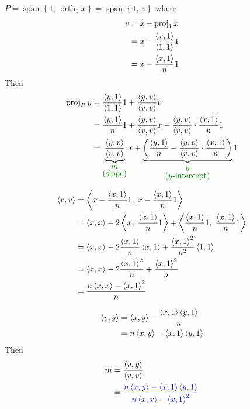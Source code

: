 \nl $P = \operatorname{span}\left\{1, \, \operatorname{orth}_{1}x \right\} = \operatorname{span}\left\{1,\, v\right\}$ where
\begin{align*}
    v &= x - \proj{1}{x}\\
    &= x - \frac{\inner{x,1}}{\inner{1,1}}{1}\\
    &= x - \frac{\inner{x,1}}{n}{1}
\end{align*}
Then 
\begin{align*}
    \proj{P}{y} &= \frac{\inner{y,1}}{\inner{1,1}}1 + \frac{\inner{y,v}}{\inner{v,v}} v\\
    &= \frac{\inner{y,1}}{n}{1} + \frac{\inner{y,v}}{\inner{v,v}}x -\frac{\inner{y,v}}{\inner{v,v}} \cdot \frac{\inner{x,1}}{n}{1}\\
    &= \underbrace{\frac{\inner{y,v}}{\inner{v,v}}}_{\setGreen\substack{\textstyle m\\  \textstyle\text{(slope)}}}x + \underbrace{\pars{\frac{\inner{y,1}}{n} - \frac{\inner{y,v}}{\inner{v,v}}\cdot\frac{\inner{x,1}}{n}}}_{ \setGreen \substack{\textstyle b\\\textstyle\text{(}y \text{-intercept)}}}1
\end{align*}

\begin{align*}
    \inner{v,v} &= \inner{x - \frac{\inner{x,1}}{n}1,\; x - \frac{\inner{x,1}}{n}1}\\
    &= \inner{x,x} -2 \inner{x,\; \frac{\inner{x,1}}{n}1} + \inner{\frac{\inner{x,1}}{n}1,\; \frac{\inner{x,1}}{n}1}\\
    &= \inner{x,x} - 2 \frac{\inner{x,1}}{n}\inner{x,1} + \frac{\inner{x,1}^2}{n^2}\inner{1,1}\\
    &= \inner{x,x} - 2 \frac{\inner{x,1}^2}{n} + \frac{\inner{x,1}^2}{n}\\
    &= \frac{n \inner{x,x} - \inner{x,1}^2}{n}
\end{align*}

\begin{align*}
    \inner{v,y} &= \inner{x,y} - \frac{\inner{x,1}\inner{y,1}}{n}\\
    &= n\inner{x,y} - \inner{x,1}\inner{y,1}
\end{align*}
Then
\begin{align*}
    m &= \frac{\inner{v,y}}{\inner{v,v}}\\
    &= \setBlue\frac{n\inner{x,y} - \inner{x,1}\inner{y,1}}{n\inner{x,x} - \inner{x,1}^2}
\end{align*}

